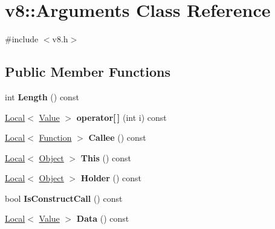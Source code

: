 \hypertarget{classv8_1_1_arguments}{}\section{v8\+:\+:Arguments Class Reference}
\label{classv8_1_1_arguments}


{\ttfamily \#include $<$v8.\+h$>$}

\subsection*{Public Member Functions}
\begin{DoxyCompactItemize}
\item 
\hypertarget{classv8_1_1_arguments_a97eccdad977805addef87a226e8fa3ea}{}int {\bfseries Length} () const \label{classv8_1_1_arguments_a97eccdad977805addef87a226e8fa3ea}

\item 
\hypertarget{classv8_1_1_arguments_a5e1469798ec583dea629f0133642ba57}{}\hyperlink{classv8_1_1_local}{Local}$<$ \hyperlink{classv8_1_1_value}{Value} $>$ {\bfseries operator\mbox{[}$\,$\mbox{]}} (int i) const \label{classv8_1_1_arguments_a5e1469798ec583dea629f0133642ba57}

\item 
\hypertarget{classv8_1_1_arguments_a80af1dbab38d48ae31942bb18bfe09a7}{}\hyperlink{classv8_1_1_local}{Local}$<$ \hyperlink{classv8_1_1_function}{Function} $>$ {\bfseries Callee} () const \label{classv8_1_1_arguments_a80af1dbab38d48ae31942bb18bfe09a7}

\item 
\hypertarget{classv8_1_1_arguments_a379e33897093c39b30ba93915d5d0427}{}\hyperlink{classv8_1_1_local}{Local}$<$ \hyperlink{classv8_1_1_object}{Object} $>$ {\bfseries This} () const \label{classv8_1_1_arguments_a379e33897093c39b30ba93915d5d0427}

\item 
\hypertarget{classv8_1_1_arguments_abd1ec0262e216fccd1562d73883b79a7}{}\hyperlink{classv8_1_1_local}{Local}$<$ \hyperlink{classv8_1_1_object}{Object} $>$ {\bfseries Holder} () const \label{classv8_1_1_arguments_abd1ec0262e216fccd1562d73883b79a7}

\item 
\hypertarget{classv8_1_1_arguments_aeffe00062bc761f815b6ffb9897cec0e}{}bool {\bfseries Is\+Construct\+Call} () const \label{classv8_1_1_arguments_aeffe00062bc761f815b6ffb9897cec0e}

\item 
\hypertarget{classv8_1_1_arguments_ac6d32758f78341929783ab2112dd5f7f}{}\hyperlink{classv8_1_1_local}{Local}$<$ \hyperlink{classv8_1_1_value}{Value} $>$ {\bfseries Data} () const \label{classv8_1_1_arguments_ac6d32758f78341929783ab2112dd5f7f}

\end{DoxyCompactItemize}
